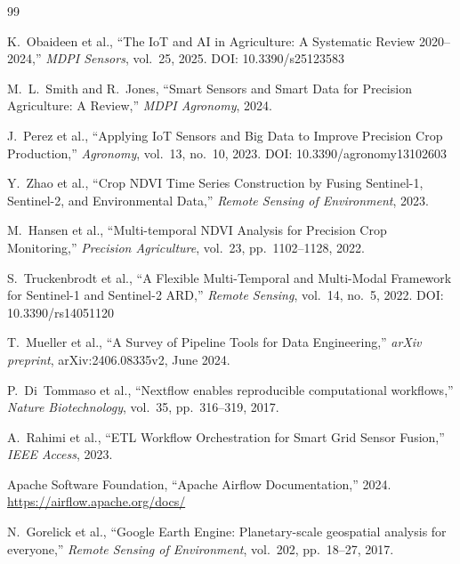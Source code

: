 \documentclass[12pt,a4paper]{article}
\theoremstyle{plain}
\theoremstyle{definition}
\theoremstyle{remark}
\begin{document}
	\begin{thebibliography}{99}
		
		K.~Obaideen et al.,
		``The IoT and AI in Agriculture: A Systematic Review 2020--2024,''
		\textit{MDPI Sensors}, vol.~25, 2025.
		DOI: 10.3390/s25123583
		
		M.~L.~Smith and R.~Jones,
		``Smart Sensors and Smart Data for Precision Agriculture: A Review,''
		\textit{MDPI Agronomy}, 2024.
		
		J.~Perez et al.,
		``Applying IoT Sensors and Big Data to Improve Precision Crop Production,''
		\textit{Agronomy}, vol.~13, no.~10, 2023.
		DOI: 10.3390/agronomy13102603
		
		Y.~Zhao et al.,
		``Crop NDVI Time Series Construction by Fusing Sentinel-1, Sentinel-2,
		and Environmental Data,''
		\textit{Remote Sensing of Environment}, 2023.
		
		M.~Hansen et al.,
		``Multi-temporal NDVI Analysis for Precision Crop Monitoring,''
		\textit{Precision Agriculture}, vol.~23, pp.~1102--1128, 2022.
		
		S.~Truckenbrodt et al.,
		``A Flexible Multi-Temporal and Multi-Modal Framework for Sentinel-1
		and Sentinel-2 ARD,''
		\textit{Remote Sensing}, vol.~14, no.~5, 2022.
		DOI: 10.3390/rs14051120
		
		T.~Mueller et al.,
		``A Survey of Pipeline Tools for Data Engineering,''
		\textit{arXiv preprint}, arXiv:2406.08335v2, June 2024.
		
		P.~Di~Tommaso et al.,
		``Nextflow enables reproducible computational workflows,''
		\textit{Nature Biotechnology}, vol.~35, pp.~316--319, 2017.
		
		A.~Rahimi et al.,
		``ETL Workflow Orchestration for Smart Grid Sensor Fusion,''
		\textit{IEEE Access}, 2023.
		
		Apache Software Foundation,
		``Apache Airflow Documentation,'' 2024.
		\url{https://airflow.apache.org/docs/}
		
		N.~Gorelick et al.,
		``Google Earth Engine: Planetary-scale geospatial analysis for everyone,''
		\textit{Remote Sensing of Environment}, vol.~202, pp.~18--27, 2017.
		

\end{thebibliography}
\end{document}
